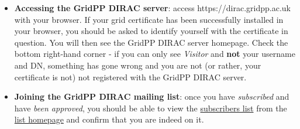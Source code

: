 \begin{itemize}
\tightlist
\item
  \textbf{Accessing the GridPP DIRAC server}: access
  https://dirac.gridpp.ac.uk with your browser. If your grid certificate
  has been successfully installed in your browser, you should be asked
  to identify yourself with the certificate in question. You will then
  see the GridPP DIRAC server homepage. Check the bottom right-hand
  corner - if you can only see \emph{Visitor} and \textbf{not} your
  username and DN, something has gone wrong and you are not (or rather,
  your certificate is not) not registered with the GridPP DIRAC server.
\item
  \textbf{Joining the GridPP DIRAC mailing list}: once you have
  \emph{subscribed} and have \emph{been approved}, you should be able to
  view the
  \href{https://mailman.ic.ac.uk/mailman/roster/gridpp-dirac-users}{subscribers
  list} from the
  \href{https://mailman.ic.ac.uk/mailman/listinfo/gridpp-dirac-users}{list
  homepage} and confirm that you are indeed on it.
\end{itemize}
